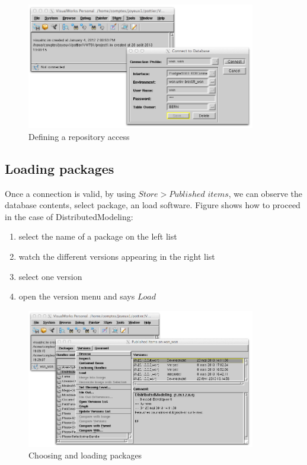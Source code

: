 \documentclass[times,a4paper]{book}
\begin{document}
\begin{figure}[hbtp]
\begin{center} 
\includegraphics[width=10cm]{store-access.png}
\caption{Defining a repository access }
\label{fig:store-access}
\end{center}
\end{figure}

\subsection {Loading packages }

Once a connection is valid, by using $Store>Published$ $items$, we can observe the database contents, select
package, an load software. Figure \label{fig:store-load} shows how to proceed in the case of DistributedModeling:

\begin{enumerate}
\item select the name of a package on the left list
\item watch the different versions appearing in the right list
\item select one version
\item open the version menu and says $Load$
\end{enumerate}

\begin{figure}[hbtp]
\begin{center} 
\includegraphics[width=10cm]{store-load.png}
\caption{Choosing and loading packages}
\label{fig:store-load}
\end{center}
\end{figure}
\end{document}

